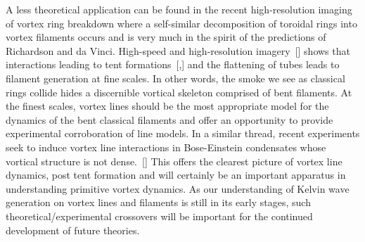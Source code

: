 \documentclass[aps,graphicx,reprint,onecolumn,12pt,tightenlines,longbibliography]{revtex4-1}
\begin{document}
{A less theoretical application can be found in the recent high-resolution imaging of vortex ring breakdown where a self-similar decomposition of toroidal rings into vortex filaments occurs and is very much in the spirit of the predictions of Richardson and da Vinci. High-speed and high-resolution imagery~[] shows that interactions leading to tent formations~[,] and the flattening of tubes leads to filament generation at fine scales. In other words, the smoke we see as classical rings collide hides a discernible vortical skeleton comprised of bent filaments. At the finest scales, vortex lines should be the most appropriate model for the dynamics of the bent classical filaments and offer an opportunity to provide experimental corroboration of line models. In a similar thread, recent experiments seek to induce vortex line interactions in Bose-Einstein condensates whose vortical structure is not dense.~[] This offers the clearest picture of vortex line dynamics, post tent formation and will certainly be an important apparatus in understanding primitive vortex dynamics. As our understanding of Kelvin wave generation on vortex lines and filaments is still in its early stages, such theoretical/experimental crossovers will be important for the continued development of future theories.








}
\end{document}
